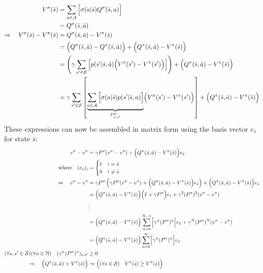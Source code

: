 \begin{align*}
    V^\sigma(\bar{s}) &= \sum_{a\in\mathcal{A}}{\Bigl[ \sigma(a\vert \bar{s}) Q^\sigma(\bar{s}, a) \Bigr]} \\
    &= Q^\sigma(\bar{s}, \bar{a}) \\
    \Rightarrow \quad V^\sigma(\bar{s}) - V^\pi(\bar{s}) &= Q^\sigma(\bar{s}, \bar{a}) - V^\pi(\bar{s}) \\
    &= \Bigl(Q^\sigma(\bar{s}, \bar{a}) - Q^\pi(\bar{s}, \bar{a})\Bigr) + \Bigl(Q^\pi(\bar{s}, \bar{a}) - V^\pi(\bar{s})\Bigr) \\
    &= \left( \gamma \sum_{s'\in\mathcal{S}}{\left[ p(s'\vert \bar{s}, \bar{a}) \Bigl( V^\sigma(s') - V^\pi(s') \Bigr) \right]} \right) + \Bigl(Q^\pi(\bar{s}, \bar{a}) - V^\pi(\bar{s})\Bigr) \\
    &= \gamma\sum_{s'\in\mathcal{S}}{\left[ \underbrace{\sum_{a\in\mathcal{A}}{\Bigl[ \sigma(a\vert \bar{s}) p(s'\vert \bar{s}, a) \Bigr]}}_{P^\sigma_{\bar{s}, s'}} \Bigl( V^\sigma(s') - V^\pi(s') \Bigr) \right]} + \Bigl(Q^\pi(\bar{s}, \bar{a}) - V^\pi(\bar{s})\Bigr) \\
\end{align*}
These expressions can now be assembled in matrix form using the basis vector $e_{\bar{s}}$ for state $\bar{s}$:
\begin{align*}
    v^\sigma - v^\pi &= \gamma P^\sigma (v^\sigma - v^\pi) + \Bigl(Q^\pi(\bar{s}, \bar{a}) - V^\pi(\bar{s})\Bigr)e_{\bar{s}} \\
    \text{where} \quad (e_{\bar{s}})_i &= \begin{cases}
        1 & i = \bar{s} \\
        0 & i \ne \bar{s}
    \end{cases} \\
    \Rightarrow \quad v^\sigma - v^\pi &= \gamma P^\sigma \left( \gamma P^\sigma (v^\sigma - v^\pi) + \Bigl(Q^\pi(\bar{s}, \bar{a}) - V^\pi(\bar{s})\Bigr)e_{\bar{s}} \right) + \Bigl(Q^\pi(\bar{s}, \bar{a}) - V^\pi(\bar{s})\Bigr)e_{\bar{s}} \\
    &= \Bigl(Q^\pi(\bar{s}, \bar{a}) - V^\pi(\bar{s})\Bigr) \Bigl( I + \gamma P^\sigma \Bigr) e_{\bar{s}} + \gamma^2 (P^\sigma)^2 (v^\sigma - v^\pi) \\
    &\vdots \\
    &= \Bigl(Q^\pi(\bar{s}, \bar{a}) - V^\pi(\bar{s})\Bigr) \sum_{n=0}^{N-1} \Bigl[ \gamma^n (P^\sigma)^n \Bigr] e_{\bar{s}} + \gamma^N (P^\sigma)^N (v^\sigma - v^\pi) \\
    &= \Bigl(Q^\pi(\bar{s}, \bar{a}) - V^\pi(\bar{s})\Bigr) \sum_{n=0}^{\infty} \Bigl[ \gamma^n (P^\sigma)^n \Bigr] e_{\bar{s}} \\
    (\forall s,s'\in\mathcal{S})(\forall n\in\mathbb{N}) \quad (\gamma^n (P^\sigma)^n)_{s,s'} &\ge 0 \\
    \Rightarrow \quad \Bigl(Q^\pi(\bar{s}, \bar{a}) > V^\pi(\bar{s})\Bigr) &\Rightarrow \Bigl( (\forall s\in\mathcal{S}) \quad V^\sigma(s) \ge V^\pi(s) \Bigr)
\end{align*}
